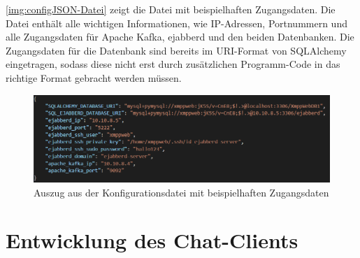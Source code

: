 \documentclass[a4paper,titlepage,halfparskip,12pt]{scrreprt}
\begin{document}
\begin{onehalfspacing}
\pagebreak

\autoref{img:configJSON-Datei} zeigt die Datei mit beispielhaften Zugangsdaten. Die Datei enthält alle wichtigen Informationen, wie IP-Adressen, Portnummern und alle Zugangsdaten für Apache Kafka, ejabberd und den beiden Datenbanken. Die Zugangsdaten für die Datenbank sind bereits im \acs{URI}-Format von SQLAlchemy eingetragen, sodass diese nicht erst durch zusätzlichen Programm-Code in das richtige Format gebracht werden müssen.

\begin{figure}[h]
	\centering
	\includegraphics[width=\linewidth]{images/configJSON-Datei}
	\caption{Auszug aus der Konfigurationsdatei mit beispielhaften Zugangsdaten}
	\label{img:configJSON-Datei}
\end{figure}

\pagebreak

\section{Entwicklung des Chat-Clients}
\label{sec:ClientEntwicklung}


\end{onehalfspacing}
\end{document}
